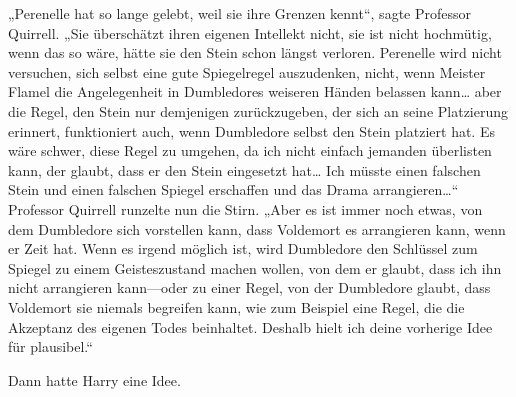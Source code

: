 „Perenelle hat so lange gelebt, weil sie ihre Grenzen kennt“, sagte Professor Quirrell. „Sie überschätzt ihren eigenen Intellekt nicht, sie ist nicht hochmütig, wenn das so wäre, hätte sie den Stein schon längst verloren. Perenelle wird nicht versuchen, sich selbst eine gute Spiegelregel auszudenken, nicht, wenn Meister Flamel die Angelegenheit in Dumbledores weiseren Händen belassen kann… aber die Regel, den Stein nur demjenigen zurückzugeben, der sich an seine Platzierung erinnert, funktioniert auch, wenn Dumbledore selbst den Stein platziert hat. Es wäre schwer, diese Regel zu umgehen, da ich nicht einfach jemanden überlisten kann, der glaubt, dass er den Stein eingesetzt hat… Ich müsste einen falschen Stein und einen falschen Spiegel erschaffen und das Drama arrangieren…“
Professor Quirrell runzelte nun die Stirn.
„Aber es ist immer noch etwas, von dem Dumbledore sich vorstellen kann, dass Voldemort es arrangieren kann, wenn er Zeit hat. Wenn es irgend möglich ist, wird Dumbledore den Schlüssel zum Spiegel zu einem Geisteszustand machen wollen, von dem er glaubt, dass ich ihn nicht arrangieren kann—oder zu einer Regel, von der Dumbledore glaubt, dass Voldemort sie niemals begreifen kann, wie zum Beispiel eine Regel, die die Akzeptanz des eigenen Todes beinhaltet. Deshalb hielt ich deine vorherige Idee für plausibel.“

Dann hatte Harry eine Idee.


